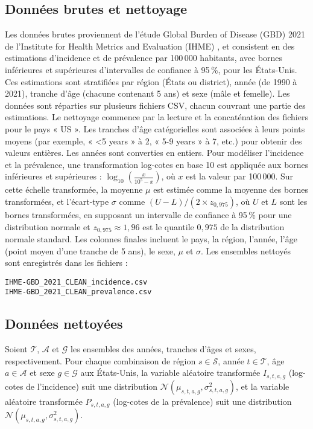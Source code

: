 \subsection{Données brutes et nettoyage}
Les données brutes proviennent de l'étude Global Burden of Disease (GBD) 2021 de l'Institute for Health Metrics and Evaluation (IHME) \citep{IHME2024GBD}, et consistent en des estimations d'incidence et de prévalence par 100\,000 habitants, avec bornes inférieures et supérieures d'intervalles de confiance à 95\,\%, pour les États-Unis. Ces estimations sont stratifiées par région (États ou district), année (de 1990 à 2021), tranche d'âge (chacune contenant 5 ans) et sexe (mâle et femelle). Les données sont réparties sur plusieurs fichiers CSV, chacun couvrant une partie des estimations.
Le nettoyage commence par la lecture et la concaténation des fichiers pour le pays « US ». Les tranches d'âge catégorielles sont associées à leurs points moyens (par exemple, « <5 years » à 2, « 5-9 years » à 7, etc.) pour obtenir des valeurs entières. Les années sont converties en entiers.
Pour modéliser l'incidence et la prévalence, une transformation log-cotes en base 10 est appliquée aux bornes inférieures et supérieures : $\log_{10} \left( \frac{x}{10^5 - x} \right)$, où $x$ est la valeur par 100\,000. Sur cette échelle transformée, la moyenne $\mu$ est estimée comme la moyenne des bornes transformées, et l'écart-type $\sigma$ comme $(U - L) / (2 \times z_{0,975})$, où $U$ et $L$ sont les bornes transformées, en supposant un intervalle de confiance à 95\,\% pour une distribution normale et $z_{0,975} \approx 1{,}96$ est le quantile $0,975$ de la distribution normale standard.
Les colonnes finales incluent le pays, la région, l'année, l'âge (point moyen d'une tranche de 5 ans), le sexe, $\mu$ et $\sigma$. Les ensembles nettoyés sont enregistrés dans les fichiers :
\begin{center}
	\texttt{IHME-GBD\_2021\_CLEAN\_incidence.csv} \\
	\texttt{IHME-GBD\_2021\_CLEAN\_prevalence.csv}
\end{center}
\subsection{Données nettoyées}
Soient $\mathcal{T}$, $\mathcal{A}$ et $\mathcal{G}$ les ensembles des années, tranches d'âges et sexes, respectivement. Pour chaque combinaison de région $s \in \mathcal{S}$, année $t \in \mathcal{T}$, âge $a \in \mathcal{A}$ et sexe $g \in \mathcal{G}$ aux États-Unis, la variable aléatoire transformée $I_{s,t,a,g}$ (log-cotes de l'incidence) suit une distribution $\mathcal{N}(\mu_{s,t,a,g}, \sigma_{s,t,a,g}^2)$, et la variable aléatoire transformée $P_{s,t,a,g}$ (log-cotes de la prévalence) suit une distribution $\mathcal{N}(\mu_{s,t,a,g}, \sigma_{s,t,a,g}^2)$.